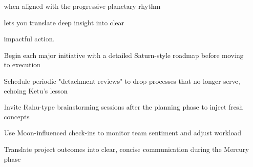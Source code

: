 {\fontsize{9}{13}\selectfont when aligned with the progressive planetary rhythm}\par\vspace{1.8mm}

{\fontsize{9}{13}\selectfont lets you translate deep insight into clear}\par\vspace{1.8mm}

{\fontsize{9}{13}\selectfont impactful action.}\par\vspace{1.8mm}

\begin{diamondlist}
  \item {\fontsize{8.5}{12}\selectfont Begin each major initiative with a detailed Saturn-style roadmap before moving to execution}
  \item {\fontsize{8.5}{12}\selectfont Schedule periodic "detachment reviews" to drop processes that no longer serve, echoing Ketu's lesson}
  \item {\fontsize{8.5}{12}\selectfont Invite Rahu-type brainstorming sessions after the planning phase to inject fresh concepts}
  \item {\fontsize{8.5}{12}\selectfont Use Moon-influenced check-ins to monitor team sentiment and adjust workload}
  \item {\fontsize{8.5}{12}\selectfont Translate project outcomes into clear, concise communication during the Mercury phase}
\end{diamondlist}



